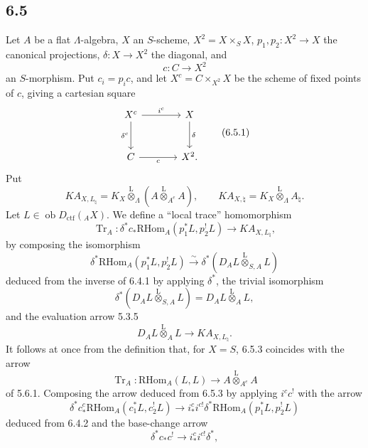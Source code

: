 \documentclass[11pt]{article}
\providecommand{\RHom}{\mathrm{RHom}}
\providecommand{\Tr}{\operatorname{Tr}}
\providecommand{\Tr}{\operatorname{Tr}}
\providecommand{\lten}{\overset{\mathrm L}{\otimes}}
\providecommand{\Ob}{\operatorname{ob}}
\providecommand{\Tr}{\operatorname{Tr}}
\providecommand{\RHom}{\mathrm{RHom}}
\providecommand{\lten}{\overset{\mathrm L}{\otimes}}
\providecommand{\RHom}{\mathrm R\mathcal{H}om}
\providecommand{\lten}{\overset{\mathrm L}{\otimes}}
\providecommand{\Ob}{\operatorname{ob}}
\providecommand{\Tr}{\operatorname{Tr}}
\providecommand{\lten}{\overset{\mathrm L}{\otimes}}
\providecommand{\lten}{\overset{\mathrm L}{\otimes}}
\providecommand{\Ob}{\operatorname{Ob}}
\providecommand{\lten}{\overset{\mathrm L}{\otimes}}
\providecommand{\RHom}{\mathrm{RHom}}
\begin{document}
\subsection*{6.5}
Let $A$ be a flat $\Lambda$-algebra, $X$ an $S$-scheme, $X^2=X\times_SX$, $p_1,p_2:X^2\to X$ the canonical projections, $\delta:X\to X^2$ the diagonal, and
\[
c:C\longrightarrow X^2
\]
an $S$-morphism. Put $c_i=p_ic$, and let $X^c=C\times_{X^2}X$ be the scheme of fixed points of $c$, giving a cartesian square
\begin{equation}
\begin{tikzcd}[column sep=large,row sep=large]
X^c \arrow[r,"i^c"] \arrow[d,"\delta^c"'] & X \arrow[d,"\delta"]\\
C \arrow[r,"c"'] & X^2 .
\end{tikzcd}
\tag{6.5.1}
\end{equation}
Put
\begin{equation}
KA_{X,L_{\natural}}=K_X\lten_{\Lambda}(A\lten_{A^e}A),
\qquad
KA_{X,\natural}=K_X\lten_{\Lambda}A_{\natural}.
\tag{6.5.2}
\end{equation}
Let $L\in\Ob D_{\mathrm{ctf}}({}_AX)$. We define a “local trace” homomorphism
\begin{equation}
\Tr_A:\delta^*c_*\RHom_A(p_1^*L,p_2^!L)
\longrightarrow
KA_{X,L_{\natural}},
\tag{6.5.3}
\end{equation}
by composing the isomorphism
\begin{equation}
\delta^*\RHom_A(p_1^*L,p_2^!L)
\xrightarrow{\sim}
\delta^*(D_AL\lten_{S,A}L)
\tag{6.5.4}
\end{equation}
deduced from the inverse of 6.4.1 by applying $\delta^*$, the trivial isomorphism
\begin{equation}
\delta^*(D_AL\lten_{S,A}L)=D_AL\lten_AL,
\tag{6.5.5}
\end{equation}
and the evaluation arrow 5.3.5
\begin{equation}
D_AL\lten_AL\longrightarrow KA_{X,L_{\natural}}.
\tag{6.5.6}
\end{equation}
It follows at once from the definition that, for $X=S$, 6.5.3 coincides with the arrow
\[
\Tr_A:\RHom_A(L,L)\longrightarrow A\lten_{A^e}A
\]
of 5.6.1. Composing the arrow deduced from 6.5.3 by applying $i^cc^!$ with the arrow
\begin{equation}
\delta^*c_*^c\RHom_A(c_1^*L,c_2^!L)
\longrightarrow
i_*^ci^{c!}\delta^*\RHom_A(p_1^*L,p_2^!L)
\tag{6.5.7}
\end{equation}
deduced from 6.4.2 and the base-change arrow
\[
\delta^*c_*c^!\longrightarrow i_*^ci^{c!}\delta^*,
\]
\end{document}
